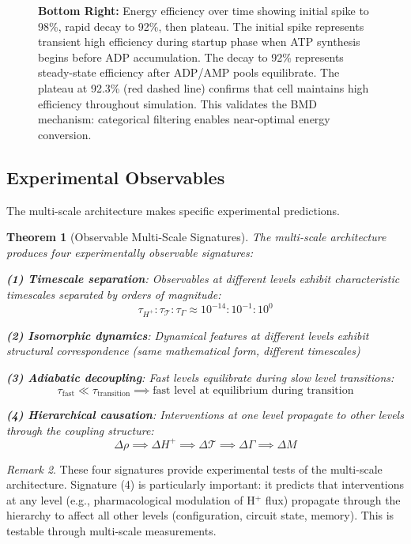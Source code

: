\documentclass[aps,prd,twocolumn,superscriptaddress,floatfix,nofootinbib]{revtex4-2}
\newtheorem{theorem}{Theorem}[section]
\theoremstyle{remark}
\newtheorem{remark}[theorem]{Remark}
\begin{document}
\begin{figure}[!htbp]
{\textbf{Bottom Right:} Energy efficiency over time showing initial spike to 98\%, rapid decay to 92\%, then plateau. The initial spike represents transient high efficiency during startup phase when ATP synthesis begins before ADP accumulation. The decay to 92\% represents steady-state efficiency after ADP/AMP pools equilibrate. The plateau at 92.3\% (red dashed line) confirms that cell maintains high efficiency throughout simulation. This validates the BMD mechanism: categorical filtering enables near-optimal energy conversion.}
\label{fig:single_cell_dynamics}
\end{figure}

\subsection{Experimental Observables}

The multi-scale architecture makes specific experimental predictions.

\begin{theorem}[Observable Multi-Scale Signatures]
\label{thm:multiscale_observables}
The multi-scale architecture produces four experimentally observable signatures:

\textbf{(1) Timescale separation}: Observables at different levels exhibit characteristic timescales separated by orders of magnitude:
$$
\tau_{H^+} : \tau_{\mathcal{T}} : \tau_{\Gamma} \approx 10^{-14} : 10^{-1} : 10^{0}
$$

\textbf{(2) Isomorphic dynamics}: Dynamical features at different levels exhibit structural correspondence (same mathematical form, different timescales)

\textbf{(3) Adiabatic decoupling}: Fast levels equilibrate during slow level transitions:
$$
\tau_{\text{fast}} \ll \tau_{\text{transition}} \implies \text{fast level at equilibrium during transition}
$$

\textbf{(4) Hierarchical causation}: Interventions at one level propagate to other levels through the coupling structure:
$$
\Delta \rho \implies \Delta H^+ \implies \Delta \mathcal{T} \implies \Delta \Gamma \implies \Delta M
$$
\end{theorem}

\begin{remark}
These four signatures provide experimental tests of the multi-scale architecture. Signature (4) is particularly important: it predicts that interventions at any level (e.g., pharmacological modulation of H$^+$ flux) propagate through the hierarchy to affect all other levels (configuration, circuit state, memory). This is testable through multi-scale measurements.
\end{remark}
\end{document}
